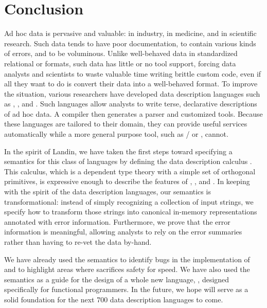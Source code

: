 \section{Conclusion} 
\label{sec:conclusion}

Ad hoc data is pervasive and valuable: in industry, in medicine, and
in scientific research.  Such data tends to have poor documentation,
to contain various kinds of errors, and to be voluminous.  Unlike
well-behaved data in standardized relational or \xml{} formats, such
data has little or no tool support, forcing data analysts and
scientists to waste valuable time writing brittle custom code, even if
all they want to do is convert their data into a well-behaved format.
To improve the situation, various researchers have developed data
description languages such as \pads{}, \datascript{}, and
\packettypes{}.  Such languages allow analysts to write terse,
declarative descriptions of ad hoc data.  A compiler then generates a
parser and customized tools.  Because these languages are tailored to
their domain, they can provide useful services automatically while a
more general purpose tool, such as \lex{}/\yacc{} or \perl{}, cannot.

In the spirit of Landin, we have taken the first steps toward
specifying a semantics for this class of languages by defining the
data description calculus \ddc{}.  This calculus, which is a dependent
type theory with a simple set of orthogonal primitives, is expressive
enough to describe the features of \pads{}, \datascript{}, and
\packettypes{}.  In keeping with the spirit of the data description
languages, our semantics is transformational: instead of simply
recognizing a collection of input strings, we specify how to transform
those strings into canonical in-memory representations annotated with
error information.  Furthermore, we prove that the error information
is meaningful, allowing analysts to rely on the error summaries rather
than having to re-vet the data by-hand.

We have already used the semantics to identify bugs in the
implementation of \padsc{} and to highlight areas where \padsc{}
sacrifices safety for speed.  We have also used the semantics as a guide
for the design of a whole new language, \padsml{}, designed
specifically for functional programmers.  In the future, we hope 
\ddc{} will serve as a solid foundation for the next 700 data 
description languages to come.
